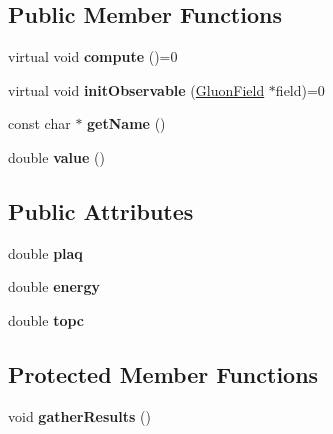 \subsection*{Public Member Functions}
\begin{DoxyCompactItemize}
\item 
virtual void {\bfseries compute} ()=0\hypertarget{classObservable_a3a8881d961623cddb85416cefa1c5432}{}\label{classObservable_a3a8881d961623cddb85416cefa1c5432}

\item 
virtual void {\bfseries init\+Observable} (\hyperlink{classField}{Gluon\+Field} $\ast$field)=0\hypertarget{classObservable_a1baf736c771a8a073554286571be8b09}{}\label{classObservable_a1baf736c771a8a073554286571be8b09}

\item 
const char $\ast$ {\bfseries get\+Name} ()\hypertarget{classObservable_ad3348c3f40782b5e09bc8dbcb8295a79}{}\label{classObservable_ad3348c3f40782b5e09bc8dbcb8295a79}

\item 
double {\bfseries value} ()\hypertarget{classObservable_ab7931d270397e55bfe82384b52db17a0}{}\label{classObservable_ab7931d270397e55bfe82384b52db17a0}

\end{DoxyCompactItemize}
\subsection*{Public Attributes}
\begin{DoxyCompactItemize}
\item 
double {\bfseries plaq}\hypertarget{classObservable_ad9e9bc025babb8fed348d7e16e424ae8}{}\label{classObservable_ad9e9bc025babb8fed348d7e16e424ae8}

\item 
double {\bfseries energy}\hypertarget{classObservable_afe50655b42d350df43ae1fe4ee8cf5fb}{}\label{classObservable_afe50655b42d350df43ae1fe4ee8cf5fb}

\item 
double {\bfseries topc}\hypertarget{classObservable_a18813c913b086462648c9e61d85d6be6}{}\label{classObservable_a18813c913b086462648c9e61d85d6be6}

\end{DoxyCompactItemize}
\subsection*{Protected Member Functions}
\begin{DoxyCompactItemize}
\item 
void {\bfseries gather\+Results} ()\hypertarget{classObservable_ae42f1c4bf6362dde45f8f6e8042f2ff5}{}\label{classObservable_ae42f1c4bf6362dde45f8f6e8042f2ff5}

\end{DoxyCompactItemize}
